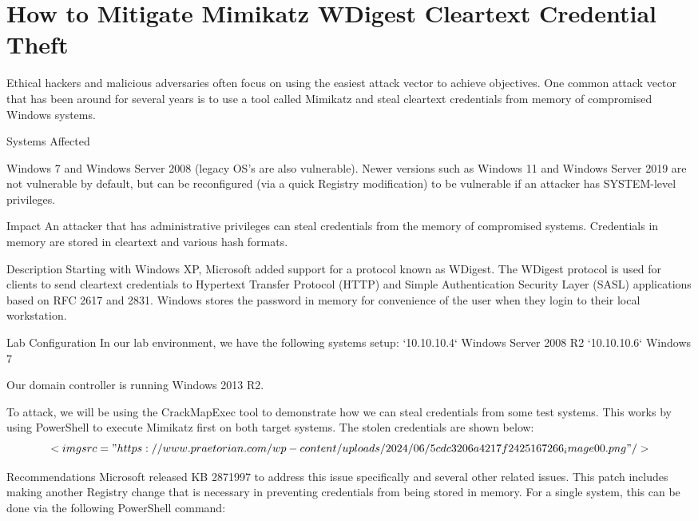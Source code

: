 \chapter{How to Mitigate Mimikatz WDigest Cleartext Credential Theft}

Ethical hackers and malicious adversaries often focus on using the easiest attack vector to achieve objectives. One common attack vector that has been around for several years is to use a tool called Mimikatz and steal cleartext credentials from memory of compromised Windows systems.

Systems Affected

Windows 7 and Windows Server 2008 (legacy OS's are also vulnerable).
Newer versions such as Windows 11 and Windows Server 2019 are not vulnerable by default, but can be reconfigured (via a quick Registry modification) to be vulnerable if an attacker has SYSTEM-level privileges.

Impact
An attacker that has administrative privileges can steal credentials from the memory of compromised systems. Credentials in memory are stored in cleartext and various hash formats.

Description
Starting with Windows XP, Microsoft added support for a protocol known as WDigest. The WDigest protocol is used for clients to send cleartext credentials to Hypertext Transfer Protocol (HTTP) and Simple Authentication Security Layer (SASL) applications based on RFC 2617 and 2831. Windows stores the password in memory for convenience of the user when they login to their local workstation.

Lab Configuration
In our lab environment, we have the following systems setup:
`10.10.10.4` Windows Server 2008 R2
`10.10.10.6` Windows 7

Our domain controller is running Windows 2013 R2.

To attack, we will be using the CrackMapExec tool to demonstrate how we can steal credentials from some test systems. This works by using PowerShell to execute Mimikatz first on both target systems. The stolen credentials are shown below:
$$<img src="https://www.praetorian.com/wp-content/uploads/2024/06/5cdc3206a4217f2425167266_image00.png"/>$$

Recommendations
Microsoft released KB 2871997 to address this issue specifically and several other related issues. This patch includes making another Registry change that is necessary in preventing credentials from being stored in memory. For a single system, this can be done via the following PowerShell command:

